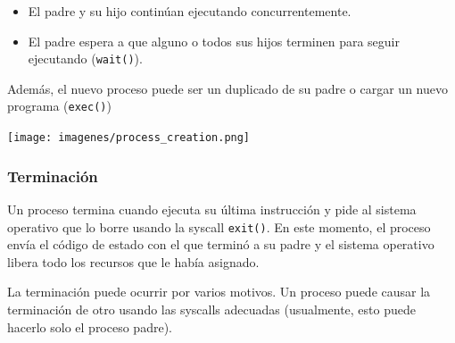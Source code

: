 \begin{itemize}
    \item El padre y su hijo continúan ejecutando concurrentemente.
    \item El padre espera a que alguno o todos sus hijos terminen para seguir ejecutando (\texttt{wait()}).
\end{itemize}

Además, el nuevo proceso puede ser un duplicado de su padre o cargar un nuevo programa (\texttt{exec()})

\begin{center}
    \texttt{[image: imagenes/process\_creation.png]}
    \end{center}

\subsubsection{Terminación}
Un proceso termina cuando ejecuta su última instrucción y pide al sistema operativo que lo borre usando la syscall \texttt{exit()}. En este momento, el proceso envía el código de estado con el que terminó a su padre y el sistema operativo libera todo los recursos que le había asignado.

La terminación puede ocurrir por varios motivos. Un proceso puede causar la terminación de otro usando las syscalls adecuadas (usualmente, esto puede hacerlo solo el proceso padre).

